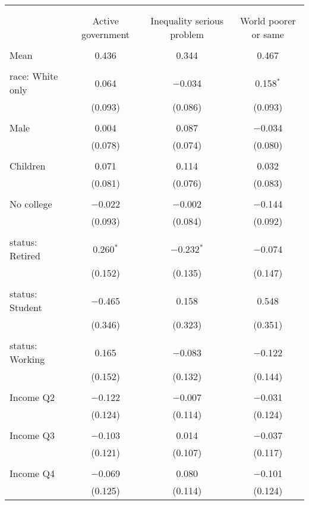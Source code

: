
\begin{tabular}{@{\extracolsep{5pt}}lccc} 
\\[-1.8ex]\hline 
\hline \\[-1.8ex] 
\\[-1.8ex] & Active government & Inequality serious problem & World poorer or same \\ 
\hline \\[-1.8ex] 
 Mean & 0.436 & 0.344 & 0.467  \\ \hline \\[-1.8ex] race: White only & 0.064 & $-$0.034 & 0.158$^{*}$ \\ 
  & (0.093) & (0.086) & (0.093) \\ 
  & & & \\ 
 Male & 0.004 & 0.087 & $-$0.034 \\ 
  & (0.078) & (0.074) & (0.080) \\ 
  & & & \\ 
 Children & 0.071 & 0.114 & 0.032 \\ 
  & (0.081) & (0.076) & (0.083) \\ 
  & & & \\ 
 No college & $-$0.022 & $-$0.002 & $-$0.144 \\ 
  & (0.093) & (0.084) & (0.092) \\ 
  & & & \\ 
 status: Retired & 0.260$^{*}$ & $-$0.232$^{*}$ & $-$0.074 \\ 
  & (0.152) & (0.135) & (0.147) \\ 
  & & & \\ 
 status: Student & $-$0.465 & 0.158 & 0.548 \\ 
  & (0.346) & (0.323) & (0.351) \\ 
  & & & \\ 
 status: Working & 0.165 & $-$0.083 & $-$0.122 \\ 
  & (0.152) & (0.132) & (0.144) \\ 
  & & & \\ 
 Income Q2 & $-$0.122 & $-$0.007 & $-$0.031 \\ 
  & (0.124) & (0.114) & (0.124) \\ 
  & & & \\ 
 Income Q3 & $-$0.103 & 0.014 & $-$0.037 \\ 
  & (0.121) & (0.107) & (0.117) \\ 
  & & & \\ 
 Income Q4 & $-$0.069 & 0.080 & $-$0.101 \\ 
  & (0.125) & (0.114) & (0.124) \\ 

\end{tabular}
